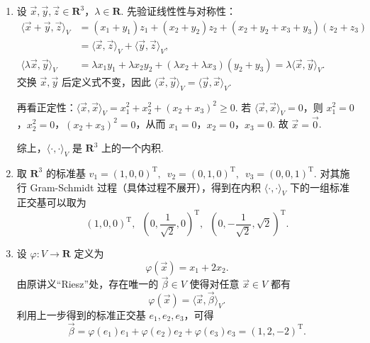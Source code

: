 \documentclass[UTF8,12pt,a4paper,fontset=fandol]{ctexart}
\begin{document}
\begin{solve}
\begin{enumerate}
        \item 设 $\vec{x}, \vec{y}, \vec{z} \in \mathbf{R}^3$，$\lambda \in \mathbf{R}$. 先验证线性性与对称性：
        \begin{align*}
            \langle \vec{x} + \vec{y}, \vec{z} \rangle_V
             & = (x_1 + y_1)z_1 + (x_2 + y_2)z_2 + (x_2 + y_2 + x_3 + y_3)(z_2 + z_3) \\
             & = \langle \vec{x}, \vec{z} \rangle_V + \langle \vec{y}, \vec{z} \rangle_V, \\
            \langle \lambda \vec{x}, \vec{y} \rangle_V
             & = \lambda x_1 y_1 + \lambda x_2 y_2 + (\lambda x_2 + \lambda x_3)(y_2 + y_3)
            = \lambda \langle \vec{x}, \vec{y} \rangle_V.
        \end{align*}
        交换 $\vec{x}, \vec{y}$ 后定义式不变，因此 $\langle \vec{x}, \vec{y} \rangle_V = \langle \vec{y}, \vec{x} \rangle_V$.

        再看正定性：$\langle \vec{x}, \vec{x} \rangle_V = x_1^2 + x_2^2 + (x_2 + x_3)^2 \geqslant 0$. 若 $\langle \vec{x}, \vec{x} \rangle_V = 0$，则 $x_1^2 = 0$，$x_2^2 = 0$，$(x_2 + x_3)^2 = 0$，从而 $x_1 = 0$，$x_2 = 0$，$x_3 = 0$. 故 $\vec{x} = \vec{0}$.

        综上，$\langle \cdot, \cdot \rangle_V$ 是 $\mathbf{R}^3$ 上的一个内积.

        \item 取 $\mathbf{R}^3$ 的标准基 $v_1 = (1, 0, 0)^{\mathrm{T}}, \enspace v_2 = (0, 1, 0)^{\mathrm{T}}, \enspace v_3 = (0, 0, 1)^{\mathrm{T}}$.
        对其施行 Gram-Schmidt 过程（具体过程不展开），得到在内积 $\langle \cdot, \cdot \rangle_V$ 下的一组标准正交基可以取为
        \[
            \left(1, 0, 0\right)^{\mathrm{T}}, \enspace \left(0, \frac{1}{\sqrt{2}}, 0\right)^{\mathrm{T}}, \enspace \left(0, -\frac{1}{\sqrt{2}}, \sqrt{2}\right)^{\mathrm{T}}.
        \]

        \item 设 $\varphi \colon V \to \mathbf{R}$ 定义为
        \[
            \varphi(\vec{x}) = x_1 + 2x_2.
        \]
        由原讲义“Riesz”处，存在唯一的 $\vec{\beta} \in V$ 使得对任意 $\vec{x} \in V$ 都有
        \[
            \varphi(\vec{x}) = \langle \vec{x}, \vec{\beta} \rangle_V.
        \]
        利用上一步得到的标准正交基 $e_1, e_2, e_3$，可得
        \[
            \vec{\beta} = \varphi(e_1)e_1 + \varphi(e_2)e_2 + \varphi(e_3)e_3 = (1, 2, -2)^{\mathrm{T}}.
        \]
    \end{enumerate}
\end{solve}
\end{document}

